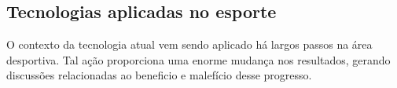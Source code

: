 \subsection{Tecnologias aplicadas no esporte}

O contexto da tecnologia atual vem sendo aplicado há largos passos na área desportiva. Tal ação proporciona uma enorme mudança nos resultados, gerando discussões relacionadas ao beneficio e malefício desse progresso.